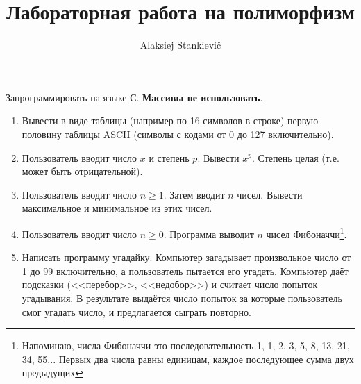 \documentclass[12pt]{article}
\author{Alaksiej Stankievič}
\title{Лабораторная работа на полиморфизм}
\begin{document}
 Запрограммировать на языке С. \textbf{Массивы не использовать}.
 \begin{enumerate}
  \item Вывести в виде таблицы (например по 16 символов в строке) первую половину таблицы ASCII (символы с кодами от 0 до 127 включительно).
  \item Пользователь вводит число $x$ и степень $p$. Вывести $x^p$. Степень целая (т.е. может быть отрицательной).
  \item Пользователь вводит число $n\geq1$. Затем вводит $n$ чисел. Вывести максимальное и минимальное из этих чисел.
  \item Пользователь вводит число $n\geq0$. Программа выводит $n$ чисел Фибоначчи\footnote{Напоминаю, числа Фибоначчи 
это последовательность 1, 1, 2, 3, 5, 8, 13, 21, 34, 55... Первых два числа равны единицам, каждое последующее сумма 
двух предыдущих}.
  \item Написать программу угадайку. Компьютер загадывает произвольное число от 1 до 99 включительно, а пользователь 
пытается его угадать. Компьютер даёт подсказки (<<перебор>>, <<недобор>>) и считает число попыток угадывания. В 
результате выдаётся число попыток за которые пользователь смог угадать число, и предлагается сыграть повторно.
 \end{enumerate}
\end{document}
